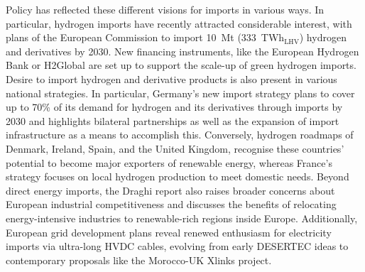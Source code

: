 
Policy has reflected these different visions for imports in various ways. In
particular, hydrogen imports have recently attracted considerable interest, with
plans of the European Commission\cite{europeancommissionRepowerEUPlan} to import
10~Mt (333~TWh$_\text{LHV}$) hydrogen and derivatives by 2030. New financing
instruments, like the European Hydrogen
Bank\cite{europeancommissionEuropeanHydrogenBank2024} or
H2Global\cite{h2globalfoundationH2Global2024} are set up to support the scale-up
of green hydrogen imports. Desire to import hydrogen and derivative products
is also present in various national
strategies.\cite{corbeauNationalHydrogenStrategies2024} In particular, Germany's
new import strategy plans to cover up to 70\% of its demand for hydrogen and its
derivatives through imports by 2030 and highlights bilateral partnerships as
well as the expansion of import infrastructure as a means to accomplish
this.\cite{germanfederalministryofeconomicaffairsandclimateactionbmwkNationalHydrogenStrategy2023,germanfederalministryofeconomicaffairsandclimateactionbmwkImportStrategyHydrogen2024}
Conversely, hydrogen roadmaps of
Denmark,\cite{danishministryofclimateenergyandutilitiesRegeringensStrategiPowertoX2021}
Ireland,\cite{departmentoftheenvironmentclimateandcommunicationsgovernmentofirelandNationalHydrogenStrategy2023}
Spain,\cite{marcoestrategicodeenergiayclimaRutaHidrogenoApuesta2020} and the
United
Kingdom,\cite{ukdepartmentforenergysecurity&netzeroHydrogenStrategyUpdate2023}
recognise these countries' potential to become major exporters of renewable
energy, whereas France's strategy focuses on local hydrogen production to meet
domestic needs.\cite{frenchgovernmentStrategieNationalePour2023} Beyond direct
energy imports, the Draghi report\cite{draghiFutureEuropeanCompetitiveness2024}
also raises broader concerns about European industrial competitiveness and
discusses the benefits of relocating energy-intensive industries to renewable-rich
regions inside Europe. Additionally, European grid development
plans\cite{entso-eTYNDP2024Project2024} reveal renewed enthusiasm for
electricity imports via ultra-long HVDC cables, evolving from early
DESERTEC\cite{desertecfoundationDESERTECSustainableWealth2024} ideas to
contemporary proposals like the Morocco-UK Xlinks
project.\cite{xlinksMoroccoUKPowerProject2023}


